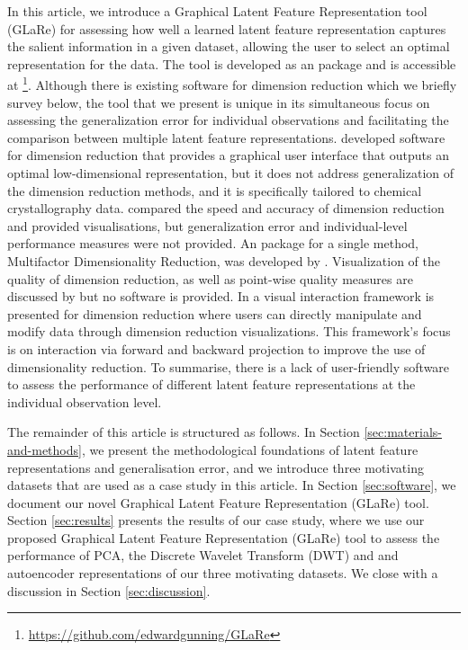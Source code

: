 In this article, we introduce a Graphical Latent Feature Representation tool (GLaRe) for assessing how well a learned latent feature representation captures the salient information in a given dataset, allowing the user to select an optimal representation for the data. The tool is developed as an  \parencite{r_core_team_r_2022} package and is accessible at \footnote{\url{https://github.com/edwardgunning/GLaRe}}. 
Although there is existing software for dimension reduction which we briefly survey below, the tool that we present is unique in its simultaneous focus on assessing the generalization error for individual observations and facilitating the comparison between multiple latent feature representations.
\textcite{samudrala_software_2014} developed software for dimension reduction that provides a graphical user interface that outputs an optimal low-dimensional representation, but it does not address generalization of the dimension reduction methods, and it is specifically tailored to chemical crystallography data.
\textcite{zubova_dimensionality_2018} compared the speed and accuracy of dimension reduction and provided visualisations, but generalization error and individual-level performance measures were not provided. 
An  package for a single method, Multifactor Dimensionality Reduction, was developed by \textcite{winham_r_2011}. Visualization of the quality of dimension reduction, as well as point-wise quality measures are discussed by \textcite{mokbel_visualizing_2013} but no software is provided. 
In \textcite{cavallo_visual_2018} a visual interaction framework is presented for dimension reduction where users can directly manipulate and modify data through dimension reduction visualizations. This framework's focus is on interaction via forward and backward projection to improve the use of dimensionality
reduction.
To summarise, there is a lack of user-friendly software to assess the performance of different latent feature representations at the individual observation level.

The remainder of this article is structured as follows.
In Section \ref{sec:materials-and-methods}, we present the methodological foundations of latent feature representations and generalisation error, and we introduce three motivating datasets that are used as a case study in this article. 
In Section \ref{sec:software}, we document our novel Graphical Latent Feature Representation (GLaRe) tool.
Section \ref{sec:results} presents the results of our case study, where we use our proposed Graphical Latent Feature Representation (GLaRe) tool to assess the performance of PCA, the Discrete Wavelet Transform (DWT) and and autoencoder representations of our three motivating datasets.
We close with a discussion in Section \ref{sec:discussion}.

